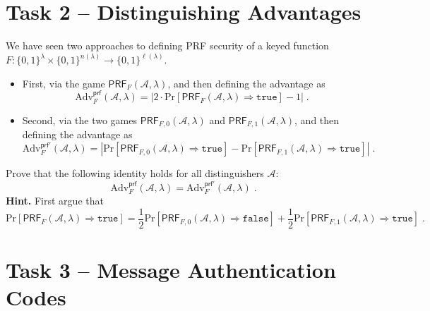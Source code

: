 \documentclass[11pt]{article}
\newcommand{\Prob}[1]{\Pr\left[#1 \right]}
\newcommand{\abs}[1]{\left| #1 \right|}
\newcommand{\bits}{\{0,1\}}
\renewcommand{\Pr}{\mathbb{P}}
\theoremstyle{plain}
\theoremstyle{definition}
\newcommand{\Adv}{\mathrm{Adv}}
\newcommand{\advA}{\mathcal{A}}
\newcommand{\true}{\texttt{true}}
\newcommand{\false}{\texttt{false}}
\renewcommand{\Pr}{\mathrm{Pr}}
\begin{document}
\newpage

\section*{Task 2 -- Distinguishing Advantages}

\noindent We have seen two approaches to defining PRF
security of a keyed function $F: \bits^\lambda \times
\bits^{n(\lambda)} \to \bits^{\ell(\lambda)}$.
\begin{itemize}
\item First, via the game $\mathsf{PRF}_{F}(\advA,\lambda)$, and then defining
  the advantage as $$\Adv^{\mathsf{prf}}_F(\advA,\lambda) = \abs{2 \cdot
    \Prob{\mathsf{PRF}_{F}(\advA,\lambda) \Rightarrow \true} - 1}\;.$$
\item Second, via the two games  $\mathsf{PRF}_{F,0}(\advA,\lambda)$ and
  $\mathsf{PRF}_{F,1}(\advA,\lambda)$, and then defining the advantage as
  $$\Adv^{\mathsf{prf}'}_F(\advA,\lambda) = \abs{
    \Prob{\mathsf{PRF}_{F,0}(\advA,\lambda) \Rightarrow \true}-\Prob{\mathsf{PRF}_{F,1}(\advA,\lambda) \Rightarrow \true} }\;.$$
\end{itemize}
Prove that the following identity holds for all
   distinguishers $\advA$:
   \begin{displaymath}
     \Adv^{\mathsf{prf}}_F(\advA,\lambda) =
     \Adv^{\mathsf{prf}'}_F(\advA,\lambda) \;.
   \end{displaymath}
   {\bf Hint.} First argue that
   \begin{displaymath}
\Prob{\mathsf{PRF}_{F}(\advA,\lambda) \Rightarrow \true} = \frac{1}{2}
\Prob{\mathsf{PRF}_{F,0}(\advA,\lambda) \Rightarrow \false} +
\frac{1}{2} \Prob{\mathsf{PRF}_{F,1}(\advA,\lambda) \Rightarrow \true} \;.
   \end{displaymath}

\newpage


\section*{Task 3 -- Message Authentication Codes}
\end{document}
